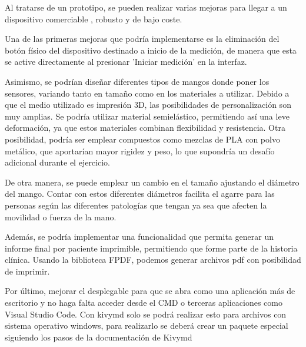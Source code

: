 Al tratarse de un prototipo, se pueden realizar varias mejoras para llegar a un dispositivo comerciable , robusto y de bajo coste.

Una de las primeras mejoras que podría implementarse es la eliminación del botón físico del dispositivo destinado a inicio de la medición, de manera que esta se active directamente al presionar 'Iniciar medición' en la interfaz. 

Asimismo, se podrían diseñar diferentes tipos de mangos donde poner los sensores, variando tanto en tamaño como en los materiales a utilizar. Debido a que el medio utilizado es impresión 3D, las posibilidades de personalización son muy amplias. Se podría utilizar material semielástico, permitiendo así una leve deformación, ya que estos materiales combinan flexibilidad y resistencia. Otra posibilidad, podría ser emplear compuestos como mezclas de PLA con polvo metálico, que aportarían mayor rigidez y peso, lo que supondría un desafío adicional durante el ejercicio.

De otra manera, se puede emplear un cambio en el tamaño ajustando el diámetro del mango. Contar con estos diferentes diámetros facilita el agarre para las personas según las diferentes patologías que tengan ya sea que afecten la movilidad o fuerza de la mano.

Además, se podría implementar una funcionalidad que permita generar un informe final por paciente imprimible, permitiendo que forme parte de la historia clínica. Usando la biblioteca FPDF, podemos generar archivos pdf con posibilidad de imprimir.

Por último, mejorar el desplegable para que se abra como una aplicación más de escritorio y no haga falta acceder desde el CMD o terceras aplicaciones como Visual Studio Code.
Con kivymd solo se podrá realizar esto para archivos con sistema operativo windows, para realizarlo se deberá crear un paquete especial siguiendo los pasos de la documentación de Kivymd \cite{kivymdapp}